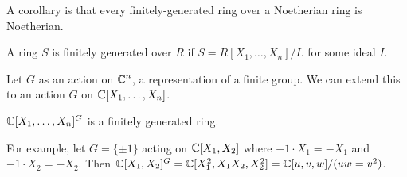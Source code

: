 A corollary is that every finitely-generated ring over a Noetherian ring is Noetherian.
\begin{definition}
A ring
$S$ is finitely generated over $R$ if $S = R[X_1, \dots, X_n]/I$. for some ideal $I$.
\end{definition}

Let $G$ as an action on $\operatorname{\mathbb{C}}^n$, a representation of a finite group. We can extend this to an action $G$ on $\operatorname{\mathbb{C}}[X_1, \dots, X_n]$.
\begin{theorem}
    $\operatorname{\mathbb{C}}[X_1, \dots, X_n]^G$ is a finitely generated ring.
\end{theorem}

For example, let $G = \{\pm 1\}$ acting on $\operatorname{\mathbb{C}}[X_1, X_2]$ where $-1 \cdot X_1 = -X_1$ and $-1 \cdot X_2 = -X_2$.
Then $\operatorname{\mathbb{C}}[X_1, X_2]^G = \operatorname{\mathbb{C}}[X_1^2, X_1 X_2, X_2^2] = \operatorname{\mathbb{C}}[u, v, w]/(uw = v^2)$.